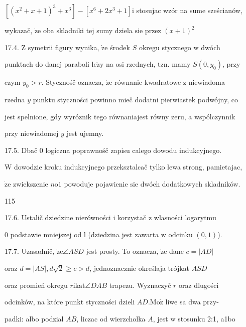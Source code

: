 \documentclass[a4paper,12pt]{article}
\begin{document}
$[(x^{2}+x+1)^{3}+x^{3}] - [x^{6}+2x^{3}+1] \mathrm{i}$ stosujac wzór na sume sześcianów,

wykazač, $\dot{\mathrm{z}}\mathrm{e}$ oba skladniki tej sumy dziela $\mathrm{s}\mathrm{i}\mathrm{e}$ przez $(x+1)^{2}$

17.4. $\mathrm{Z}$ symetrii figury wynika, $\dot{\mathrm{z}}\mathrm{e}$ środek $S$ okregu stycznego $\mathrm{w}$ dwóch

punktach do danej paraboli $\mathrm{l}\mathrm{e}\dot{\mathrm{z}}\mathrm{y}$ na osi rzednych, $\mathrm{t}\mathrm{z}\mathrm{n}$. mamy $S(0,y_{0})$, przy

czym $y_{0} > r$. Stycznośč oznacza, $\dot{\mathrm{z}}\mathrm{e}$ równanie kwadratowe $\mathrm{z}$ niewiadoma

rzedna $y$ punktu styczności powinno mieč dodatni pierwiastek podwójny, co

jest spelnione, gdy wyróznik tego równaniajest równy zeru, a wspólczynnik

przy niewiadomej $y$ jest ujemny.

17.5. Dbač $0$ logiczna poprawnośč zapisu calego dowodu indukcyjnego.

$\mathrm{W}$ dowodzie kroku indukcyjnego przeksztalcač tylko lewa strong, pamietajac,

$\dot{\mathrm{z}}\mathrm{e}$ zwiekszenie $n\mathrm{o}1$ powoduje pojawienie $\mathrm{s}\mathrm{i}\mathrm{e}$ dwóch dodatkowych skladników.





115

17.6. Ustalič dziedzine nierówności $\mathrm{i}$ korzystač $\mathrm{z}$ wlasności logarytmu

$0$ podstawie mniejszej od l (dziedzina jest zawarta $\mathrm{w}$ odcinku $(0,1)$).

17.7. Uzasadnič, $\dot{\mathrm{z}}\mathrm{e} \angle ASD$ jest prosty. To oznacza, $\dot{\mathrm{z}}\mathrm{e}$ dane $c= |AD|$

oraz $d = |AS|, d\sqrt{2} \geq c > d$, jednoznacznie określaja trójkat $ASD$

oraz promień okregu $r \mathrm{i}\mathrm{k}\mathrm{a}\mathrm{t} \angle DAB$ trapezu. Wyznaczyč $r$ oraz dlugości

odcinków, na które punkt styczności dzieli $AD. \mathrm{M}\mathrm{o}\dot{\mathrm{z}}$ liwe sa dwa przy-

padki: albo podzial $AB$, liczac od wierzcholka $A$, jest $\mathrm{w}$ stosunku 2:1, a1bo
\end{document}
